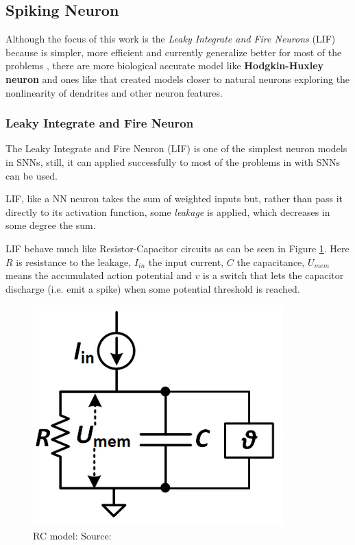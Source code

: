 	\subsection{Spiking Neuron}
		\par Although the focus of this work is the \textit{Leaky Integrate and Fire Neurons} (LIF) because is simpler, more efficient and currently generalize better for most of the problems \cite{dan_goodman_2022_7044500}, there are more biological accurate model like \textbf{Hodgkin-Huxley neuron} \cite{gerstner2014neuronal} and ones like \cite{jones2020single} that created models closer to natural neurons exploring the nonlinearity of dendrites and other neuron features.
	
		\subsubsection{Leaky Integrate and Fire Neuron}
			\par The Leaky Integrate and Fire Neuron (LIF) is one of the simplest neuron models in SNNs, still, it can applied successfully to most of the problems in with SNNs can be used.

				\par LIF, like a NN neuron takes the sum of weighted inputs but, rather than pass it directly to its activation function, some \textit{leakage} is applied, which decreases in some degree the sum. 
				\par LIF behave much like Resistor-Capacitor circuits as can be seen in Figure \ref{fig:rcmodel}. Here $R$ is resistance to the leakage, $I_{in}$ the input current, $C$ the capacitance, $U_{mem}$ means the accumulated action potential and $v$ is a switch that lets the capacitor discharge (i.e. emit a spike) when some potential threshold is reached.

				\begin{figure}[H]
					\centering
					\includegraphics[width=0.5\linewidth]{images/rcmodel}
					\caption[The RC model]{RC model: Source: \cite{10242251}}
					\label{fig:rcmodel}
				\end{figure}
			
